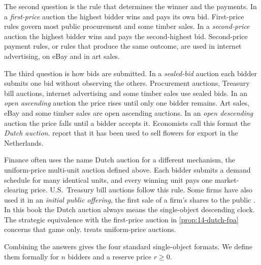 The second question is the rule that determines the winner and the payments. In a \emph{first-price}
auction the highest bidder wins and pays its own bid. First-price rules govern most public procurement and
some timber sales. In a \emph{second-price} auction the highest bidder wins and pays the second-highest bid.
Second-price payment rules, or rules that produce the same outcome, are used in internet advertising, on
eBay and in art sales.

The third question is how bids are submitted. In a \emph{sealed-bid} auction each bidder submits one bid
without observing the others. Procurement auctions, Treasury bill auctions, internet advertising and some
timber sales use sealed bids. In an \emph{open ascending} auction the price rises until only one bidder
remains. Art sales, eBay and some timber sales are open ascending auctions. In an \emph{open descending}
auction the price falls until a bidder accepts it. Economists call this format the \emph{Dutch auction}.
 report that it has been used to sell flowers for export in
the Netherlands.

Finance often uses the name Dutch auction for a different mechanism, the uniform-price multi-unit auction
defined above. Each bidder submits a demand schedule for many identical units, and every winning unit
pays one market-clearing price. U.S.\ Treasury bill auctions follow this rule. Some firms have also used
it in an \emph{initial public offering}, the first sale of a firm's shares to the public
\citep[Section~10.1, p.~108 and footnote~110]{AtheyHaile2007}. In this book the Dutch auction always
means the single-object descending clock. The strategic equivalence with the first-price auction in
\cref{prop:14-dutch-fpa} concerns that game only.  treats uniform-price auctions.

Combining the answers gives the four standard single-object formats. We define them formally for $n$
bidders and a reserve price $r\ge 0$.

